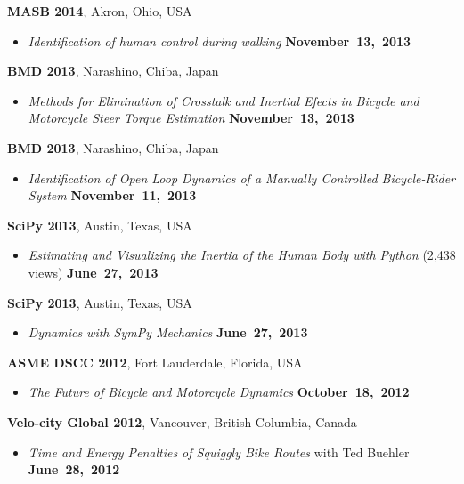 \documentclass[10pt]{article}
\newenvironment{outerlist}[1][\enskip\textbullet]%
        {\begin{itemize}[#1]}{\end{itemize}%
         \vspace{-.6\baselineskip}}
\newenvironment{innerlist}[1][\enskip\textbullet]%
        {\begin{compactitem}[#1]}{\end{compactitem}}
\newcommand{\blankline}{\quad\pagebreak[2]}
\begin{document}
\begin{innerlist}
\blankline

\textbf{MASB 2014}, Akron, Ohio, USA
\begin{outerlist}
\item[] \textit{Identification of human control during walking}
    \hfill \textbf{November~13,~2013}
\end{outerlist}

\blankline

\textbf{BMD 2013}, Narashino, Chiba, Japan
\begin{outerlist}
  \item[] \textit{Methods for Elimination of Crosstalk and Inertial Efects in
    Bicycle and Motorcycle Steer Torque Estimation}
    \hfill \textbf{November~13,~2013}
\end{outerlist}

\blankline

\textbf{BMD 2013}, Narashino, Chiba, Japan
\begin{outerlist}
  \item[] \textit{Identification of Open Loop Dynamics of a Manually Controlled
    Bicycle-Rider System}
    \hfill \textbf{November~11,~2013}
\end{outerlist}

\blankline

\textbf{SciPy 2013}, Austin, Texas, USA
\begin{outerlist}
  \item[] \textit{Estimating and Visualizing the Inertia of the Human Body with
    Python} (2,438 views)
    \hfill \textbf{June~27,~2013}
\end{outerlist}

\blankline

\textbf{SciPy 2013}, Austin, Texas, USA
\begin{outerlist}
  \item[] \textit{Dynamics with SymPy Mechanics}
    \hfill \textbf{June~27,~2013}
\end{outerlist}

\blankline

\textbf{ASME DSCC 2012}, Fort Lauderdale, Florida, USA
\begin{outerlist}
  \item[] \textit{The Future of Bicycle and Motorcycle Dynamics}
    \hfill \textbf{October~18,~2012}
\end{outerlist}

\blankline

\textbf{Velo-city Global 2012}, Vancouver, British Columbia, Canada
\begin{outerlist}
  \item[] \textit{Time and Energy Penalties of Squiggly Bike Routes} with Ted
    Buehler
  \hfill \textbf{June~28,~2012}
\end{outerlist}


\end{innerlist}
\end{document}
